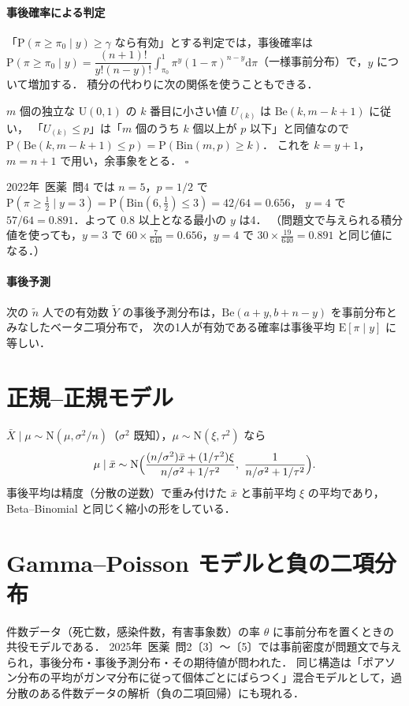 \documentclass[a4paper,11pt,openany]{ltjsbook}
\newtheorem{meidai}[teigi]{命題}
\newenvironment{proof}[1][証明]{\par\smallskip\noindent{\sffamily\bfseries #1}\quad\ignorespaces}{\nobreak\hfill$\square$\par\medskip}
\newcommand{\tagbox}[2]{\tcbox[on line,boxsep=0.5pt,left=2pt,right=2pt,top=0.5pt,bottom=0.5pt,
  colframe=#1,colback=#1!10,boxrule=0.4pt,arc=1pt]{\scriptsize\bfseries\textcolor{#1}{#2}}}
\newcommand{\Hinshutsu}{\tagbox{bkorange}{頻出}}
\newcommand{\kakomon}[2]{\mbox{#1年 医薬 問#2}}
\newcommand{\E}{\mathrm{E}}
\newcommand{\Prob}{\mathrm{P}}
\newcommand{\dd}{\mathrm{d}}
\newcommand{\Normal}{\mathrm{N}}
\newcommand{\Bin}{\mathrm{Bin}}
\newcommand{\Be}{\mathrm{Be}}
\newcommand{\Unif}{\mathrm{U}}
\begin{document}
\paragraph{事後確率による判定}
「$\Prob(\pi\ge\pi_0\mid y)\ge\gamma$ なら有効」とする判定では，事後確率は
$\Prob(\pi\ge\pi_0\mid y)=\dfrac{(n+1)!}{y!(n-y)!}\displaystyle\int_{\pi_0}^1\pi^y(1-\pi)^{n-y}\dd\pi$（一様事前分布）で，$y$ について増加する．
積分の代わりに次の関係を使うこともできる．
\begin{proof}
$m$ 個の独立な $\Unif(0,1)$ の $k$ 番目に小さい値 $U_{(k)}$ は $\Be(k,m-k+1)$ に従い，
「$U_{(k)}\le p$」は「$m$ 個のうち $k$ 個以上が $p$ 以下」と同値なので $\Prob(\Be(k,m-k+1)\le p)=\Prob(\Bin(m,p)\ge k)$．
これを $k=y+1$，$m=n+1$ で用い，余事象をとる．
\end{proof}
\kakomon{2022}{4} では $n=5$，$p=1/2$ で $\Prob(\pi\ge\frac12\mid y=3)=\Prob(\Bin(6,\tfrac12)\le3)=42/64=0.656$，
$y=4$ で $57/64=0.891$．よって $0.8$ 以上となる最小の $y$ は4．
（問題文で与えられる積分値を使っても，$y=3$ で $60\times\frac{7}{640}=0.656$，$y=4$ で $30\times\frac{19}{640}=0.891$ と同じ値になる．）

\paragraph{事後予測}
次の $\tilde n$ 人での有効数 $\tilde Y$ の事後予測分布は，$\Be(a+y,b+n-y)$ を事前分布とみなしたベータ二項分布で，
次の1人が有効である確率は事後平均 $\E[\pi\mid y]$ に等しい．

\section{正規--正規モデル}\label{sec:17-normal}
$\bar X\mid\mu\sim\Normal(\mu,\sigma^2/n)$（$\sigma^2$ 既知），$\mu\sim\Normal(\xi,\tau^2)$ なら
\[
\mu\mid\bar x\sim\Normal\Bigl(\frac{(n/\sigma^2)\bar x+(1/\tau^2)\xi}{n/\sigma^2+1/\tau^2},\ \frac{1}{n/\sigma^2+1/\tau^2}\Bigr).
\]
事後平均は精度（分散の逆数）で重み付けた $\bar x$ と事前平均 $\xi$ の平均であり，Beta--Binomial と同じく縮小の形をしている．

\section{Gamma--Poisson モデルと負の二項分布}\label{sec:17-gammapois}
\Hinshutsu
件数データ（死亡数，感染件数，有害事象数）の率 $\theta$ に事前分布を置くときの共役モデルである．
\kakomon{2025}{2}〔3〕〜〔5〕では事前密度が問題文で与えられ，事後分布・事後予測分布・その期待値が問われた．
同じ構造は「ポアソン分布の平均がガンマ分布に従って個体ごとにばらつく」混合モデルとして，過分散のある件数データの解析（負の二項回帰）にも現れる．
\end{document}
